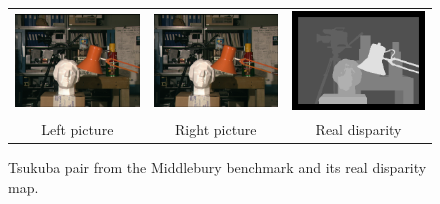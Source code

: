 \documentclass{article}
\begin{document}
\begin{figure}[h]
\begin{center}	
\begin{tabular}{ccc}
\includegraphics[scale=0.33]{Images/tsukuba.png} &
\includegraphics[scale=0.33]{Images/tsukuba_right.png} &
\includegraphics[scale=0.33]{Images/tsukuba_disp.png}
\\
Left picture & Right picture & Real disparity
\end{tabular}
	\caption{Tsukuba pair from the Middlebury benchmark \cite{middleBench} and its real disparity map.}
\end{center}
\end{figure}
\end{document}
